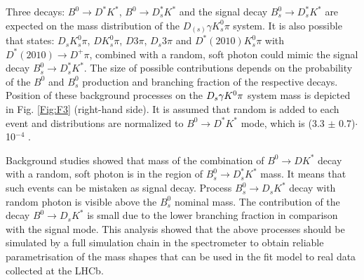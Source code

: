 \documentclass{appolb}
\begin{document}
Three decays: $B^0 \rightarrow D^* K^*$, $B^0 \rightarrow D^*_s K^*$ and the signal decay $B_s^0\rightarrow D^*_s K^*$ are expected on the mass distribution of the $D_{(s)} \gamma K^0_s \pi$ system. It is also possible that states: $D_s K^0_s \pi$, $D K^0_s \pi$, $D 3\pi$, $D_s 3\pi$ and  $D^*(2010)K^0_s \pi$ with $D^*(2010)\rightarrow D^+ \pi$, combined with a random, soft photon could mimic the signal decay $ B^0_s\rightarrow D^*_s K^*$. The size of possible contributions depends on the probability of the $B^0$ and $B^0_s$ production and branching fraction of the respective decays. Position of these background processes on the $D_s {\gamma} K^0 \pi$ system mass is depicted in Fig. \ref{Fig:F3} (right-hand side). It is assumed that random \g is added to each event and distributions are normalized to $B^0\rightarrow D^*K^*$ mode, which is (3.3 $\pm$ 0.7)$\cdot$10$^{-4}$ \cite{pdg_group}. 

Background studies showed that mass of the combination of  $B^0 \rightarrow DK^*$ decay with a random, soft photon is in the region of  $B_s^0 \rightarrow D^*_s K^*$ mass. It means that such events can be mistaken as signal decay. Process $B_s^0\rightarrow D_s K^*$ decay with random photon is visible above the $B^0_s$ nominal mass.
The contribution of the decay $B^0 \rightarrow D_sK^*$ is small
due to the lower branching fraction in comparison with the signal mode. This analysis showed that the above processes should be simulated by a full simulation chain in the spectrometer to obtain reliable parametrisation of the mass shapes that can be used in the fit model to real data collected at the LHCb.
\end{document}
